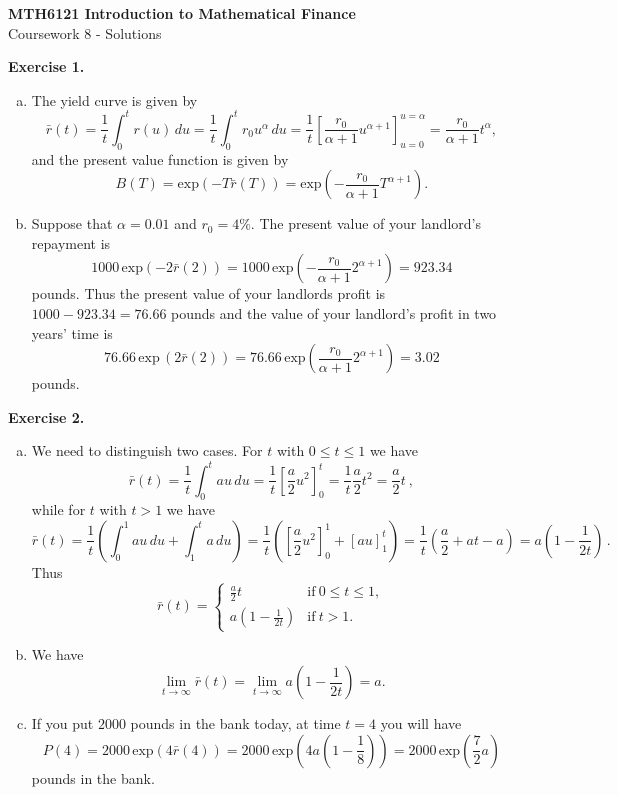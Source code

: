 \documentclass[11pt,a4paper]{report}
\begin{document}
    \begin{center}
        \LARGE\textbf{MTH6121 Introduction to Mathematical Finance}\\
        Coursework 8 - Solutions
    \end{center}
    \textbf{Exercise 1.}
    \begin{enumerate}[(a)]
        \item The yield curve is given by
        $$
        \bar{r}(t)
        =
        \frac{1}{t}\int_0^t r(u)\, du 
        =
        \frac{1}{t}\int_0^t r_0u^\alpha\, du 
        =
        \frac{1}{t}\left[\frac{r_0}{\alpha + 1}u^{\alpha + 1}\right]_{u=0}^{u=\alpha}
        =
        \frac{r_0}{\alpha+1}t^\alpha,
        $$
        and the present value function is given by
        $$
        B(T)
        =
        \text{exp}(-T\bar{r}(T))
        =
        \text{exp}\left(-\frac{r_0}{\alpha+1}T^{\alpha+1}\right).
        $$
        \item Suppose that $\alpha = 0.01$ and $r_0 = 4\%$. The present value of your landlord’s repayment is
        $$
        1000\,\text{exp}(-2\bar{r}(2))
        =
        1000\,\text{exp}\left(-\frac{r_0}{\alpha+1}2^{\alpha+1}\right)
        =
        923.34
        $$
        pounds. Thus the present value of your landlords profit is $1000 − 923.34 = 76.66$ pounds and the value of your landlord’s profit in two years’ time is
        $$
        76.66\,\text{exp}\, (2\bar{r}(2))
        =
        76.66\,\text{exp}\left(\frac{r_0}{\alpha+1}2^{\alpha+1}\right)
        =
        3.02
        $$
        pounds.
    \end{enumerate}
    \textbf{Exercise 2.}
    \begin{enumerate}[(a)]
        \item We need to distinguish two cases. For $t$ with $0 \leq t \leq 1$ we have
        $$
        \bar{r}(t)
        = \frac{1}{t}\int_0^t au\, du
        = \frac{1}{t}\left[\frac{a}{2}u^2\right]_0^t
        = \frac{1}{t}\frac{a}{2}t^2
        = \frac{a}{2}t\ ,
        $$
        while for $t$ with $t > 1$ we have
        $$
        \bar{r}(t)
        = \frac{1}{t}\left(\int_0^1 au\, du+\int_1^t a\, du\right)
        = \frac{1}{t}\left(\left[\frac{a}{2}u^2\right]_0^1+\left[au\right]_1^t\right)
        = \frac{1}{t}\left(\frac{a}{2}+at-a\right)
        = a\left(1- \frac{1}{2t}\right)\, .
        $$
        Thus
        $$
        \bar{r}(t)
        =
        \begin{cases}
            \frac{a}{2}t & \text{if}\ 0 \leq t \leq 1,\\
            a\left(1-\frac{1}{2t}\right) & \text{if}\ t>1.
        \end{cases}
        $$
        \item  We have
        $$
        \lim_{t \to \infty}\bar{r}(t)
        = \lim_{t \to \infty}a\left(1 - \frac{1}{2t}\right)
        = a.
        $$
        \item If you put $2000$ pounds in the bank today, at time $t = 4$ you will have
        $$
        P(4)
        = 2000\, \text{exp}(4\bar{r}(4))
        = 2000\, \text{exp}\left(4a\left(1-\frac{1}{8}\right)\right)
        = 2000\, \text{exp}\left(\frac{7}{2}a\right)
        $$
        pounds in the bank.
    \end{enumerate}
\end{document}
